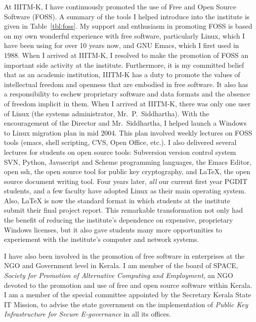 \documentclass[titlepage, %
11pt, 
]{article}
\begin{document}
At IIITM-K, I have continuously promoted the use of Free and
Open Source Software (FOSS).  A summary of the tools I
helped introduce into the institute is given in
Table~\ref{tbl:foss}.  My support and enthusiasm in
promoting FOSS is based on my own wonderful experience with
free software, particularly Linux, which I have been using
for over 10 years now, and GNU Emacs, which I first used in
1988.  When I arrived at IIITM-K, I resolved to make the
promotion of FOSS an important side activity at the
institute.  Furthermore, it is my committed belief that as
an academic institution, IIITM-K has a duty to promote the
values of intellectual freedom and openness that are
embodied in free software.  It also has a responsibility to
eschew proprietary software and data formats and the absence
of freedom implicit in them.  When I arrived at IIITM-K,
there was only one user of Linux (the systems administrator,
Mr.~P.~Siddhartha).  With the encouragement of the Director
and Mr.~Siddhartha, I helped launch a Windows to Linux
migration plan in mid 2004.  This plan involved weekly
lectures on FOSS tools (emacs, shell scripting, CVS, Open
Office, etc.).  I also delivered several lectures for
students on open source tools: Subversion version control
system SVN, Python, Javascript and Scheme programming
languages, the Emacs Editor, open ssh, the open source tool
for public key cryptography, and \LaTeX, the open source
document writing tool.  Four years later, {\em all\/} our
current first year PGDIT students, and a few faculty have
adopted Linux as their main operating system.  Also, \LaTeX
is now the standard format in which students at the
institute submit their final project report.  This
remarkable transformation not only had the benefit of
reducing the institute's dependence on expensive,
proprietary Windows licenses, but it also gave students many
more opportunities to experiement with the institute's
computer and network systems.  

I have also been involved in the promotion of free software
in enterprises at the NGO and Government level in Kerala.  I
am member of the board of SPACE, {\em Society for Promotion
  of Alternative Computing and Employment}, an NGO devoted
to the promotion and use of free and open source software
within Kerala.  I am a member of the special committee
appointed by the Secretary Kerala State IT Mission, to
advise the state government on the implementation of {\em
  Public Key Infrastructure for Secure E-governance\/} in
all its offices.
\end{document}
